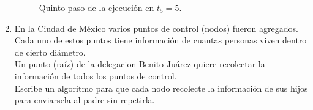 \documentclass[12pt,a4paper]{report}
\begin{document}
\begin{enumerate}
{\begin{figure}[h!]
\begin{center}
					\caption{Quinto paso de la ejecución en $t_5=5$.}
				\end{center}
			\end{figure}
			\newpage
		}

		\item {
			En la Ciudad de México varios puntos de control (nodos) fueron agregados.\\
			Cada uno de estos puntos tiene información de cuantas personas viven
			dentro de cierto diámetro. \\
			Un punto (raíz) de la delegacion Benito Juárez quiere recolectar la
			información de todos los puntos de control. \\
			Escribe un algoritmo para que cada nodo recolecte la información de sus
			hijos para enviarsela al padre sin repetirla.\\

}
\end{enumerate}
\end{document}
